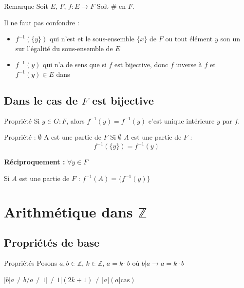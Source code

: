 \documentclass[a4paper,11pt]{article}
\begin{document}
\begin{remarkbox}{Remarque}
Soit $E$, $F$, $f : E \to F$ Soit $\#$ en $F$.

Il ne faut pas confondre :
\begin{itemize}
    \item $f^{-1}(\{y\})$ qui n'est et le sous-ensemble $\{x\}$ de $F$ ou tout élément $y$ son un sur l'égalité du sous-ensemble de $E$
    \item $f^{-1}(y)$ qui n'a de sens que si $f$ est bijective, donc $f$ inverse à $f$ et $f^{-1}(y) \in E$ dans
\end{itemize}
\end{remarkbox}

\subsection{Dans le cas de $F$ est bijective}

\begin{propbox}{Propriété}
Si $y \in G : F$, alors $f^{-1}(y) = f^{-1}(y)$ c'est unique intérieure $y$ par $f$.
\end{propbox}

\begin{propbox}{Propriété : $\emptyset$ A est une partie de $F$}
Si $\emptyset$ $A$ est une partie de $F$ :
\[f^{-1}(\{y\}) = f^{-1}(y)\]

\textbf{Réciproquement :}
$\forall y \in F$

Si $A$ est une partie de $F$ : $f^{-1}(A) = \{f^{-1}(y)\}$
\end{propbox}

\newpage
\section{Arithmétique dans $\mathbb{Z}$}

\subsection{Propriétés de base}

\begin{propbox}{Propriétés}
Posons $a, b \in \mathbb{Z}$, $k \in \mathbb{Z}$, $a = k \cdot b$ où $b | a \rightarrow a = k \cdot b$

$|b| a \neq b/a \neq 1| \neq 1 | (2k + 1) \neq |a| (a | \text{cas})$
\end{propbox}
\end{document}
